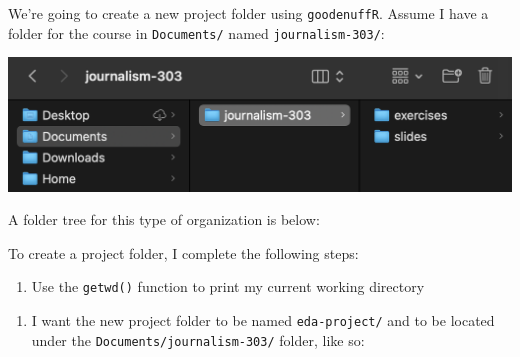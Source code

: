 \documentclass[letterpaper,9pt,twoside,]{pinp}
\providecommand{\tightlist}{%
  \setlength{\itemsep}{0pt}\setlength{\parskip}{0pt}}
\begin{document}
We're going to create a new project folder using \texttt{goodenuffR}.
Assume I have a folder for the course in \texttt{Documents/} named
\texttt{journalism-303/}:

\begin{flushleft}\includegraphics[width=0.5\linewidth]{img/course-folder} \end{flushleft}

A folder tree for this type of organization is below:

\begin{Shaded}
\begin{Highlighting}[]
  \KeywordTok{|}\ExtensionTok{{-}{-}}
    \KeywordTok{|}\ExtensionTok{{-}{-}}
    \KeywordTok{|}\ExtensionTok{{-}{-}}
\end{Highlighting}
\end{Shaded}

To create a project folder, I complete the following steps:

\begin{enumerate}
\def\labelenumi{\arabic{enumi}.}
\tightlist
\item
  Use the \texttt{getwd()} function to print my current working
  directory
\end{enumerate}

\begin{Shaded}
\begin{Highlighting}[]
\NormalTok{()}
\end{Highlighting}
\end{Shaded}

\begin{enumerate}
\def\labelenumi{\arabic{enumi}.}
\setcounter{enumi}{1}
\tightlist
\item
  I want the new project folder to be named \texttt{eda-project/} and to
  be located under the \texttt{Documents/journalism-303/} folder, like
  so:
\end{enumerate}

\begin{Shaded}
\begin{Highlighting}[]
  \KeywordTok{|}\ExtensionTok{{-}{-}}
    \KeywordTok{|}\ExtensionTok{{-}{-}}
    \KeywordTok{|}\ExtensionTok{{-}{-}}
    \KeywordTok{|}\ExtensionTok{{-}{-}}\OperatorTok{\textless{}}
\end{Highlighting}
\end{Shaded}
\end{document}
